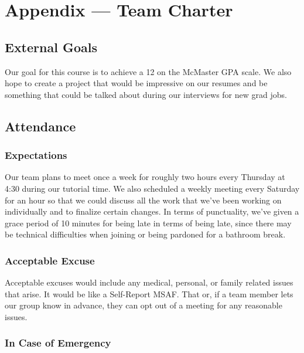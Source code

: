\documentclass{article}
\begin{document}
\newpage{}

\section*{Appendix --- Team Charter}


\subsection*{External Goals}

Our goal for this course is to achieve a 12 on the McMaster GPA scale. We also hope to create a project that would be impressive on our resumes and be something that could be talked about during our interviews for new grad jobs. 

\subsection*{Attendance}

\subsubsection*{Expectations}

Our team plans to meet once a week for roughly two hours every Thursday at 4:30 during our tutorial time. We also scheduled a weekly meeting every Saturday for an hour so that we could discuss all the work that we’ve been working on individually and to finalize certain changes. In terms of punctuality, we’ve given a grace period of 10 minutes for being late in terms of being late, since there may be technical difficulties when joining or being pardoned for a bathroom break. 

\subsubsection*{Acceptable Excuse}

Acceptable excuses would include any medical, personal, or family related issues that arise. It would be like a Self-Report MSAF. That or, if a team member lets our group know in advance, they can opt out of a meeting for any reasonable issues.

\subsubsection*{In Case of Emergency}
\end{document}
